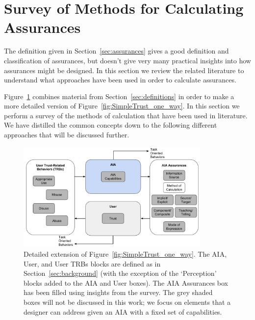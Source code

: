 \section{Survey of Methods for Calculating Assurances} \label{sec:synthesis}
    The definition given in Section~\ref{sec:assurances} gives a good definition and classification of assurances, but doesn't give very many practical insights into how assurances might be designed. In this section we review the related literature to understand what approaches have been used in order to calculate assurances.
    
    Figure~\ref{fig:refined_assurances} combines material from Section~\ref{sec:definitions} in order to make a more detailed version of Figure~\ref{fig:SimpleTrust_one_way}. In this section we perform a survey of the methods of calculation that have been used in literature. We have distilled the common concepts down to the following different approaches that will be discussed further.

    \begin{figure}[htbp]
        \centering
        \includegraphics[width=0.85\textwidth]{Figures/RefinedTrust_one_way}
        \caption{Detailed extension of Figure~\ref{fig:SimpleTrust_one_way}. The AIA, User, and User TRBs blocks are defined as in Section~\ref{sec:background} (with the exception of the `Perception' blocks added to the AIA and User boxes). The AIA Assurances box has been filled using insights from the survey. The grey shaded boxes will not be discussed in this work; we focus on elements that a designer can address given an AIA with a fixed set of capabilities.}
        \label{fig:refined_assurances}
    \end{figure}



